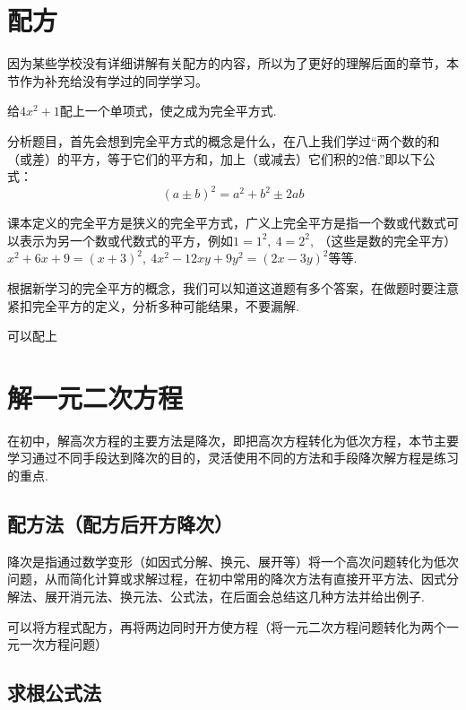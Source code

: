 \documentclass[lang=cn, 10pt, titlestyle=hang, oneside]{elegantbook}
\begin{document}
\section{配方}



因为某些学校没有详细讲解有关配方的内容，所以为了更好的理解后面的章节，本节作为补充给没有学过的同学学习。



\begin{example}
    给\( 4x^2 +1\)配上一个单项式，使之成为完全平方式.
\end{example}



分析题目，首先会想到完全平方式的概念是什么，在八上我们学过“两个数的和（或差）的平方，等于它们的平方和，加上（或减去）它们积的2倍.”即以下公式：
$$
(a\pm b)^2 = a^2+b^2\pm 2ab
$$



课本定义的完全平方是狭义的完全平方式，广义上完全平方是指一个数或代数式可以表示为另一个数或代数式的平方，例如\( 1=1^2,\ 4=2^2,\ \)（这些是数的完全平方）\(x^2+6x+9=(x+3)^2,\ 4x^2-12xy+9y^2=(2x-3y)^2\)等等.



根据新学习的完全平方的概念，我们可以知道这道题有多个答案，在做题时要注意紧扣完全平方的定义，分析多种可能结果，不要漏解.
\begin{solution}
    可以配上
\end{solution}

\section{解一元二次方程}
在初中，解高次方程的主要方法是降次，即把高次方程转化为低次方程，本节主要学习通过不同手段达到降次的目的，灵活使用不同的方法和手段降次解方程是练习的重点.
\subsection{配方法（配方后开方降次）}

降次是指通过数学变形（如因式分解、换元、展开等）将一个高次问题转化为低次问题，从而简化计算或求解过程，在初中常用的降次方法有直接开平方法、因式分解法、展开消元法、换元法、公式法，在后面会总结这几种方法并给出例子.



可以将方程式配方，再将两边同时开方使方程（将一元二次方程问题转化为两个一元一次方程问题）

\subsection{求根公式法}
\end{document}

